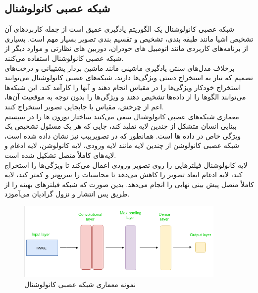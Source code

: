 \subsection{شبکه عصبی کانولوشنال}
شبکه عصبی کانولوشنال یک الگوریتم یادگیری عمیق است از جمله کاربرد‌های آن تشخیص اشیا مانند طبقه بندی، تشخیص و تقسیم بندی تصویر 
بسیار مهم است. بسیاری از برنامه‌های کاربردی مانند اتومبیل های خودران، دوربین های نظارتی و موارد دیگر از شبکه عصبی کانولوشنال استفاده می‌کنند.
\\
برخلاف مدل‌های سنتی یادگیری ماشینی مانند ماشین بردار پشتیبانی و درخت‌های تصمیم که نیاز به استخراج دستی ویژگی‌ها دارند، شبکه‌های عصبی کانولوشنال می‌توانند استخراج خودکار ویژگی‌ها را در مقیاس 
انجام دهند و آنها را کارآمد کند. این شبکه‌ها می‌توانند الگوها را از داده‌ها تشخیص دهند و ویژگی‌ها را بدون توجه به موقعیت آن‌ها، اعم از چرخش، مقیاس یا جابجایی تصویر استخراج کنند.
\\
معماری شبکه‌های عصبی کانولوشنال سعی می‌کنند ساختار نورون ها را در سیستم بینایی انسان متشکل از چندین لایه تقلید کند، جایی که هر یک مسئول تشخیص یک ویژگی خاص در داده ها است. 
همانطور که در تصویرببب نیز نشان داده شده است، شبکه عصبی کانولوشن از چندین لایه مانند لایه ورودی، لایه کانولوشن، لایه ادغام  و لایه‌های کاملاً متصل تشکیل شده است.
\\
لایه کانولوشنال فیلترهایی را روی تصویر ورودی اعمال می‌کند تا ویژگی‌ها را استخراج کند، لایه ادغام ابعاد تصویر را کاهش می‌دهد تا محاسبات را سریع‌تر و کمتر کند، لایه کاملاً متصل پیش بینی نهایی را انجام می‌دهد. بدین صورت که شبکه فیلترهای بهینه را از طریق پس انتشار و نزول گرادیان می‌آموزد.


\begin{figure}[h]
    \centering
    \includegraphics[width=0.9\textwidth]{CNN_arch.png}
    \caption{نمونه معماری شبکه عصبی کانولوشنال}
\end{figure}


